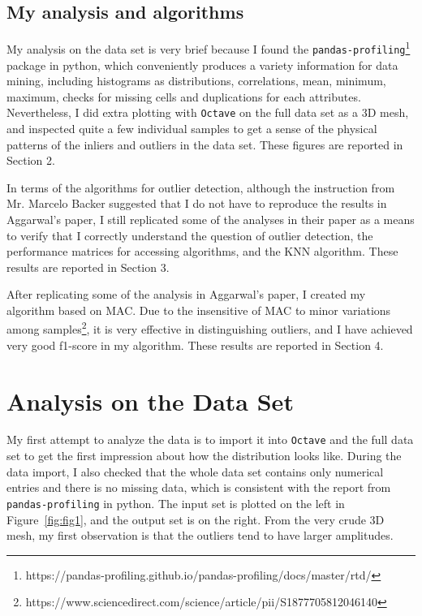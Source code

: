 \documentclass[12pt]{article}
\begin{document}
\subsection{My analysis and algorithms}

My analysis on the data set is very brief because I found the \texttt{pandas-profiling}\footnote{https://pandas-profiling.github.io/pandas-profiling/docs/master/rtd/} 
package in python, which conveniently produces a variety information for data mining, including histograms as distributions, correlations,
mean, minimum, maximum, checks for missing cells and duplications for each attributes. Nevertheless, I did extra plotting
with \texttt{Octave} on the full data set as a 3D mesh, and inspected quite a few individual samples to get a sense
of the physical patterns of the inliers and outliers in the data set. These figures are reported in Section 2.

\vspace{0.5ex}
In terms of the algorithms for outlier detection, although the instruction from Mr. Marcelo Backer suggested that I do not have to 
reproduce the results in Aggarwal's paper, I still replicated some of the analyses
in their paper as a means to verify that I correctly understand the question of outlier detection, the performance
matrices for accessing algorithms, and the KNN algorithm. These results are reported in Section 3.

\vspace{0.5ex}
After replicating some of the analysis in  Aggarwal's paper, I created my algorithm based on MAC.
Due to the insensitive of MAC to minor variations among samples\footnote{https://www.sciencedirect.com/science/article/pii/S1877705812046140},
it is very effective in distinguishing outliers, and I have achieved very good f1-score in my algorithm.
These results are reported in Section 4.

\section{Analysis on the Data Set}

My first attempt to analyze the data is to import it into \texttt{Octave} and 
the full data set to get the first impression about how the distribution looks like. During the data import,
I also checked that the whole data set contains only numerical entries and there is no missing data, which is
consistent with the report from \texttt{pandas-profiling} in python.
The input set is plotted on the left in Figure~\ref{fig:fig1}, and the output set is on the right.
From the very crude 3D mesh, my first observation is that the outliers tend to have larger amplitudes.
\end{document}
